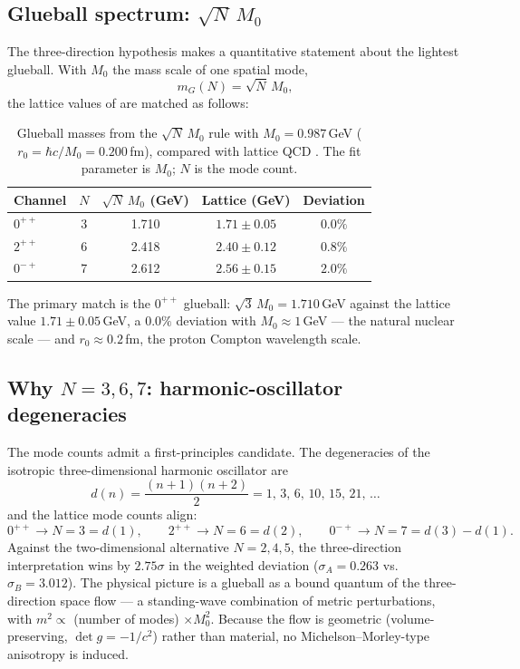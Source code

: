 \documentclass[aps,prd,preprint,superscriptaddress,amsmath,amssymb]{revtex4-2}
\begin{document}
\subsection{Glueball spectrum: $\sqrt{N}\,M_0$}

The three-direction hypothesis makes a quantitative statement about the
lightest glueball.  With $M_0$ the mass scale of one spatial mode,
\begin{equation}
m_G(N) = \sqrt{N}\,M_0 ,
\end{equation}
the lattice values of \cite{MorningstarPeardon1999,Chen2006} are matched as
follows:

\begin{table}[h]
\caption{Glueball masses from the $\sqrt{N}\,M_0$ rule with $M_0=0.987$\,GeV
($r_0=\hbar c/M_0=0.200$\,fm), compared with lattice QCD
\cite{MorningstarPeardon1999,Chen2006}.  The fit parameter is $M_0$; $N$ is
the mode count.}
\label{tab:glueball}
\begin{ruledtabular}
\begin{tabular}{lcccc}
Channel & $N$ & $\sqrt{N}\,M_0$ (GeV) & Lattice (GeV) & Deviation \\
\hline
$0^{++}$ & 3 & 1.710 & $1.71\pm0.05$ & $0.0\%$ \\
$2^{++}$ & 6 & 2.418 & $2.40\pm0.12$ & $0.8\%$ \\
$0^{-+}$ & 7 & 2.612 & $2.56\pm0.15$ & $2.0\%$ \\
\end{tabular}
\end{ruledtabular}
\end{table}

The primary match is the $0^{++}$ glueball: $\sqrt{3}\,M_0=1.710$\,GeV
against the lattice value $1.71\pm0.05$\,GeV, a $0.0\%$ deviation with
$M_0\approx 1$\,GeV --- the natural nuclear scale --- and
$r_0\approx0.2$\,fm, the proton Compton wavelength scale.

\subsection{Why $N=3,6,7$: harmonic-oscillator degeneracies}

The mode counts admit a first-principles candidate.  The degeneracies of the
isotropic three-dimensional harmonic oscillator are
\begin{equation}
d(n) = \frac{(n+1)(n+2)}{2} = 1,\,3,\,6,\,10,\,15,\,21,\,\ldots
\end{equation}
and the lattice mode counts align:
\begin{equation}
0^{++}\to N=3=d(1), \qquad
2^{++}\to N=6=d(2), \qquad
0^{-+}\to N=7=d(3)-d(1).
\end{equation}
Against the two-dimensional alternative $N=2,4,5$, the three-direction
interpretation wins by $2.75\sigma$ in the weighted deviation
($\sigma_A=0.263$ vs.\ $\sigma_B=3.012$).  The physical picture is a glueball
as a bound quantum of the three-direction space flow --- a standing-wave
combination of metric perturbations, with $m^2\propto$ (number of modes)
$\times M_0^2$.  Because the flow is geometric (volume-preserving,
$\det g=-1/c^2$) rather than material, no Michelson--Morley-type anisotropy
is induced.
\end{document}
